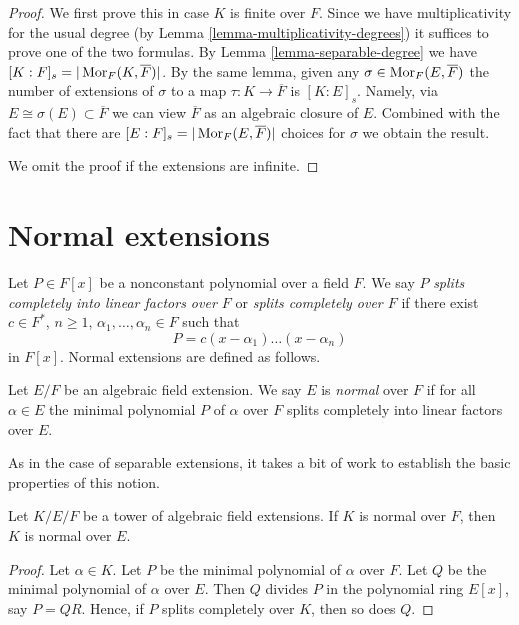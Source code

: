 \begin{proof}
We first prove this in case $K$ is finite over $F$. Since we have
multiplicativity for the usual degree (by
Lemma \ref{lemma-multiplicativity-degrees}) it suffices to prove
one of the two formulas. By Lemma \ref{lemma-separable-degree} we have
$[K : F]_s = |\mathop{\mathrm{Mor}}\nolimits_F(K, \overline{F})|$. By the same lemma,
given any $\sigma \in \mathop{\mathrm{Mor}}\nolimits_F(E, \overline{F})$ the number of extensions
of $\sigma$ to a map $\tau : K \to \overline{F}$ is $[K : E]_s$.
Namely, via $E \cong \sigma(E) \subset \overline{F}$ we can view
$\overline{F}$ as an algebraic closure of $E$. Combined with the
fact that there are $[E : F]_s = |\mathop{\mathrm{Mor}}\nolimits_F(E, \overline{F})|$ choices
for $\sigma$ we obtain the result.

\medskip\noindent
We omit the proof if the extensions are infinite.
\end{proof}









\section{Normal extensions}
\label{section-normal}

\noindent
Let $P \in F[x]$ be a nonconstant polynomial over a field $F$. We say $P$
{\it splits completely into linear factors over $F$} or
{\it splits completely over $F$} if there exist
$c \in F^*$, $n \geq 1$, $\alpha_1, \ldots, \alpha_n \in F$ such that
$$
P = c(x - \alpha_1) \ldots (x - \alpha_n)
$$
in $F[x]$. Normal extensions are defined as follows.

\begin{definition}
\label{definition-normal}
Let $E/F$ be an algebraic field extension. We say $E$ is {\it normal}
over $F$ if for all $\alpha \in E$ the minimal polynomial $P$
of $\alpha$ over $F$ splits completely into linear factors over $E$.
\end{definition}

\noindent
As in the case of separable extensions, it takes a bit of work to establish
the basic properties of this notion.

\begin{lemma}
\label{lemma-normal-goes-up}
Let $K/E/F$ be a tower of algebraic field extensions.
If $K$ is normal over $F$, then $K$ is normal over $E$.
\end{lemma}

\begin{proof}
Let $\alpha \in K$. Let $P$ be the minimal polynomial of $\alpha$ over $F$.
Let $Q$ be the minimal polynomial of $\alpha$ over $E$.
Then $Q$ divides $P$ in the polynomial ring $E[x]$, say $P = QR$.
Hence, if $P$ splits completely over $K$, then so does $Q$.
\end{proof}

